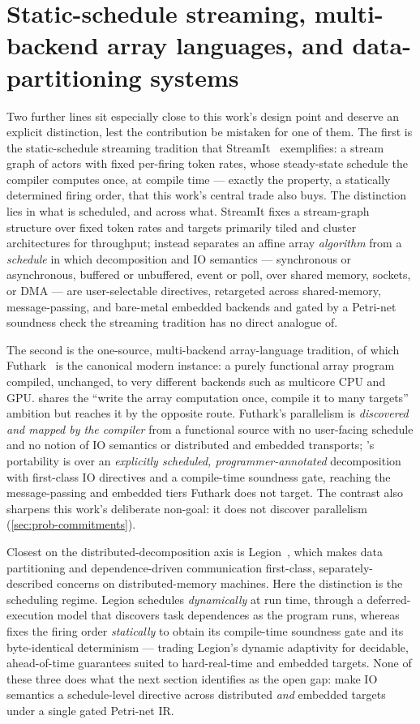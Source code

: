 \section{Static-schedule streaming, multi-backend array languages, and data-partitioning systems}\label{sec:pa-streaming}

Two further lines sit especially close to this work's design point and deserve an
explicit distinction, lest the contribution be mistaken for one of them. The first
is the static-schedule streaming tradition that StreamIt~\cite{thies2002streamit}
exemplifies: a stream graph of actors with fixed per-firing token rates, whose
steady-state schedule the compiler computes once, at compile time --- exactly the
property, a statically determined firing order, that this work's central trade also
buys. The distinction lies in what is scheduled, and across what. StreamIt fixes a
stream-graph structure over fixed token rates and targets primarily tiled and
cluster architectures for throughput; \nuc{} instead separates an affine array
\emph{algorithm} from a \emph{schedule} in which decomposition and IO semantics ---
synchronous or asynchronous, buffered or unbuffered, event or poll, over shared
memory, sockets, or DMA --- are user-selectable directives, retargeted across
shared-memory, message-passing, and bare-metal embedded backends and gated by a
Petri-net soundness check the streaming tradition has no direct analogue of.

The second is the one-source, multi-backend array-language tradition, of which
Futhark~\cite{henriksen2017futhark} is the canonical modern instance: a purely
functional array program compiled, unchanged, to very different backends such as
multicore CPU and GPU. \nuc{} shares the ``write the array computation once,
compile it to many targets'' ambition but reaches it by the opposite route.
Futhark's parallelism is \emph{discovered and mapped by the compiler} from a
functional source with no user-facing schedule and no notion of IO semantics or
distributed and embedded transports; \nuc{}'s portability is over an
\emph{explicitly scheduled, programmer-annotated} decomposition with first-class IO
directives and a compile-time soundness gate, reaching the
message-passing and embedded tiers Futhark does not target. The contrast also
sharpens this work's deliberate non-goal: it does not discover parallelism
(\cref{sec:prob-commitments}).

Closest on the distributed-decomposition axis is Legion~\cite{bauer2012legion},
which makes data partitioning and dependence-driven communication first-class,
separately-described concerns on distributed-memory machines. Here the distinction
is the scheduling regime. Legion schedules \emph{dynamically} at run time, through a
deferred-execution model that discovers task dependences as the program runs,
whereas \nuc{} fixes the firing order \emph{statically} to obtain its compile-time
soundness gate and its byte-identical determinism --- trading Legion's dynamic
adaptivity for decidable, ahead-of-time guarantees suited to hard-real-time and
embedded targets. None of these three does what the next section identifies as the
open gap: make IO semantics a schedule-level directive across distributed
\emph{and} embedded targets under a single gated Petri-net IR.

